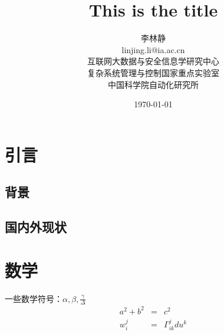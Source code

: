 \documentclass[a4paper,12pt]{article}
\begin{document}
\title{This is the title}
\author{
	李林静\\
	linjing.li@ia.ac.cn\\
	互联网大数据与安全信息学研究中心\\
	复杂系统管理与控制国家重点实验室\\
	中国科学院自动化研究所
	}
\date{\today}

\maketitle

\section{引言}

\subsection{背景}

\subsection{国内外现状}


\section{数学}

一些数学符号：$\alpha,\beta,\frac{\gamma}{\Delta}$
\begin{eqnarray}
	a^2 + b^2 &=& c^2 \\
	w_i^j &=& \Gamma_{ik}^jdu^k
\end{eqnarray}
\end{document}
